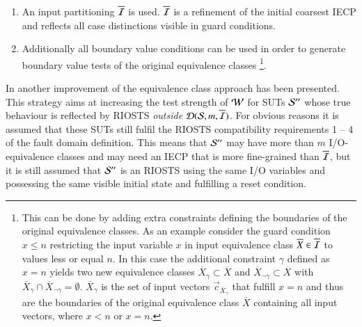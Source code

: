 \begin{enumerate}
  \item An input partitioning $\overline{\cal I}$ is used. $\overline{\cal I}$ is a refinement of the initial coarsest IECP and
reflects all case distinctions visible in guard conditions.
\item Additionally all boundary value conditions can be used in order to generate boundary
value tests of the original equivalence classes
\footnote{This can be done by adding extra constraints defining the
  boundaries of the original equivalence classes. As an example
  consider the guard condition $x\leq n$ restricting the input
  variable $x$ in input equivalence class $\overline{X}\in
  \overline{\cal I}$ to values less or equal $n$. In this case the
  additional constraint $\gamma$ defined as $x=n$ yields two new
  equivalence classes $\overline{X}_\gamma\subset\overline{X} $ and
  $\overline{X}_{\neg\gamma}\subset\overline{X}$ with
  $\overline{X}_{\gamma}\cap
  \overline{X}_{\neg\gamma}=\emptyset$. $\overline{X}_{\gamma}$ is the
  set of input vectors $\vec c_{\overline{X}_\gamma}$ that fulfill
  $x=n$ and thus are the boundaries of the original equivalence class
  $\overline{X}$ containing all input vectors, where $x<n$ or $x=n$.}.
\end{enumerate}



In \cite{huebner15} another improvement of the equivalence class approach has been
presented. This strategy 
aims at increasing the test strength of ${\cal W}$
   for SUTs ${\cal S}''$ whose
true behaviour is reflected by RIOSTS   {\it outside} 
${\cal D}({\cal S},m,\overline{{\cal I}})$. For obvious reasons it is assumed that these 
SUTs still fulfil  the RIOSTS 
compatibility requirements 1 -- 4 of the fault domain definition. This means that
${\cal S}''$ may have more than $m$ I/O-equivalence classes and may need an IECP
that is more fine-grained than $\overline{{\cal I}}$, but it is still assumed that 
${\cal S}''$ is an RIOSTS using the same I/O variables and possessing the same visible
initial state and fulfilling a reset condition.

